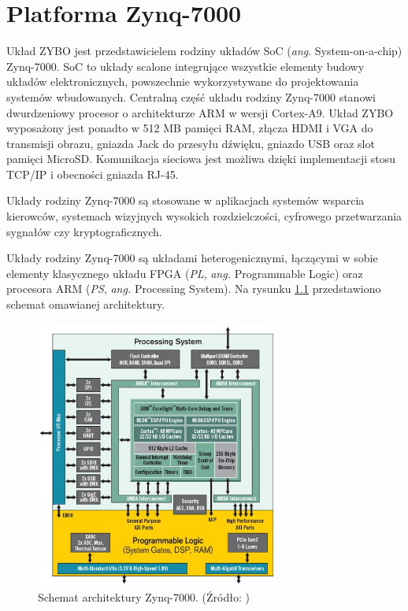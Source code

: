 \chapter{Platforma Zynq-7000}
\label{cha:platform}

Układ ZYBO jest przedstawicielem rodziny układów SoC (\emph{ang}. System-on-a-chip) Zynq-7000. SoC to układy scalone integrujące wszystkie elementy budowy układów elektronicznych, powszechnie wykorzystywane do projektowania systemów wbudowanych. Centralną część układu rodziny Zynq-7000 stanowi dwurdzeniowy procesor o architekturze ARM w wersji Cortex-A9. \cite{zynq-homepage} Układ ZYBO wyposażony jest ponadto w 512 MB pamięci RAM, złącza HDMI i VGA do transmisji obrazu, gniazda Jack do przesyłu dźwięku, gniazdo USB oraz slot pamięci MicroSD. Komunikacja sieciowa jest możliwa dzięki implementacji stosu TCP/IP i obecności gniazda RJ-45. \cite{zynq-datasheet}

Układy rodziny Zynq-7000 są stosowane w aplikacjach systemów wsparcia kierowców, systemach wizyjnych wysokich rozdzielczości, cyfrowego przetwarzania sygnałów czy kryptograficznych. \cite{GuanwenZhong,MaleenAbeydeera,PawelDabal2014}

Układy rodziny Zynq-7000 są układami heterogenicznymi, łączącymi w sobie elementy klasycznego układu FPGA (\emph{PL}, \emph{ang.} Programmable Logic) oraz procesora ARM (\emph{PS}, \emph{ang.} Processing System). Na rysunku \ref{fig:zynq-overview} przedstawiono schemat omawianej architektury.

\begin{figure}[h]
	\centering
	\includegraphics[width=8cm]{img/zyng-platform.png}
	\caption{Schemat architektury Zynq-7000. (Źródło: \cite{zybo-reference-manual})}
	\label{fig:zynq-overview}
\end{figure}

